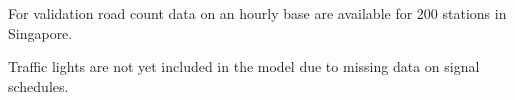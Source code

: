 For validation road count data on an hourly base are available for 200 stations in Singapore.


Traffic lights are not yet included in the model due to missing data on signal schedules.



